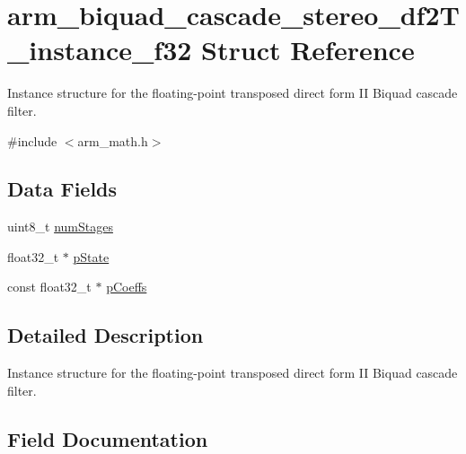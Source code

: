 \hypertarget{structarm__biquad__cascade__stereo__df2_t__instance__f32}{}\section{arm\+\_\+biquad\+\_\+cascade\+\_\+stereo\+\_\+df2\+T\+\_\+instance\+\_\+f32 Struct Reference}
\label{structarm__biquad__cascade__stereo__df2_t__instance__f32}


Instance structure for the floating-\/point transposed direct form II Biquad cascade filter.  




{\ttfamily \#include $<$arm\+\_\+math.\+h$>$}

\subsection*{Data Fields}
\begin{DoxyCompactItemize}
\item 
uint8\+\_\+t \mbox{\hyperlink{structarm__biquad__cascade__stereo__df2_t__instance__f32_a3615af038f56917909e0370c11bc2ec7}{num\+Stages}}
\item 
float32\+\_\+t $\ast$ \mbox{\hyperlink{structarm__biquad__cascade__stereo__df2_t__instance__f32_a335c87e6fdc4b96601d95a5de8b9c463}{p\+State}}
\item 
const float32\+\_\+t $\ast$ \mbox{\hyperlink{structarm__biquad__cascade__stereo__df2_t__instance__f32_a39230f04a29d8321948e339633780442}{p\+Coeffs}}
\end{DoxyCompactItemize}


\subsection{Detailed Description}
Instance structure for the floating-\/point transposed direct form II Biquad cascade filter. 

\subsection{Field Documentation}
\mbox{\label{structarm__biquad__cascade__stereo__df2_t__instance__f32_a3615af038f56917909e0370c11bc2ec7}} 

